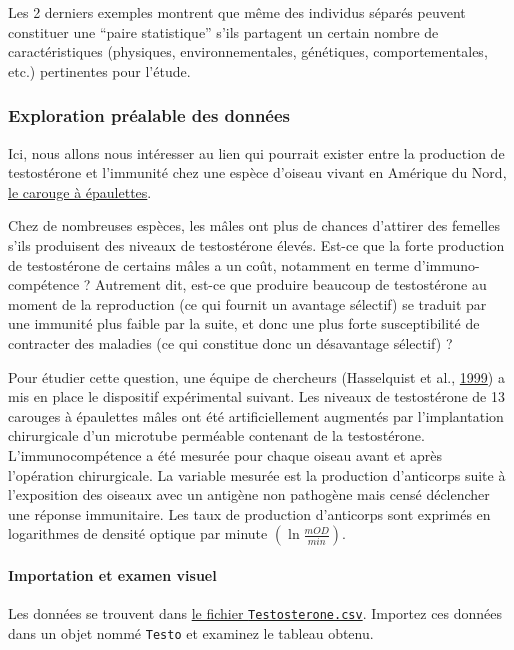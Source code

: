 \documentclass[
  a4paper,
]{article}
\begin{document}
Les 2 derniers exemples montrent que même des individus séparés peuvent constituer une ``paire statistique'' s'ils partagent un certain nombre de caractéristiques (physiques, environnementales, génétiques, comportementales, etc.) pertinentes pour l'étude.

\hypertarget{Explo2}{%
\subsubsection{Exploration préalable des données}\label{Explo2}}

Ici, nous allons nous intéresser au lien qui pourrait exister entre la production de testostérone et l'immunité chez une espèce d'oiseau vivant en Amérique du Nord, \href{https://fr.wikipedia.org/wiki/Carouge_à_épaulettes}{le carouge à épaulettes}.

Chez de nombreuses espèces, les mâles ont plus de chances d'attirer des femelles s'ils produisent des niveaux de testostérone élevés. Est-ce que la forte production de testostérone de certains mâles a un coût, notamment en terme d'immuno-compétence ? Autrement dit, est-ce que produire beaucoup de testostérone au moment de la reproduction (ce qui fournit un avantage sélectif) se traduit par une immunité plus faible par la suite, et donc une plus forte susceptibilité de contracter des maladies (ce qui constitue donc un désavantage sélectif) ?

Pour étudier cette question, une équipe de chercheurs (Hasselquist et al., \protect\hyperlink{ref-Hasselquist1999}{1999}) a mis en place le dispositif expérimental suivant. Les niveaux de testostérone de 13 carouges à épaulettes mâles ont été artificiellement augmentés par l'implantation chirurgicale d'un microtube perméable contenant de la testostérone. L'immunocompétence a été mesurée pour chaque oiseau avant et après l'opération chirurgicale. La variable mesurée est la production d'anticorps suite à l'exposition des oiseaux avec un antigène non pathogène mais censé déclencher une réponse immunitaire. Les taux de production d'anticorps sont exprimés en logarithmes de densité optique par minute \(\left(\ln\frac{mOD}{min}\right)\).

\hypertarget{importation-et-examen-visuel-1}{%
\paragraph{Importation et examen visuel}\label{importation-et-examen-visuel-1}}

Les données se trouvent dans \href{https://besibo.github.io/Biometrie3/data/Testosterone.csv}{le fichier \texttt{Testosterone.csv}}. Importez ces données dans un objet nommé \texttt{Testo} et examinez le tableau obtenu.
\end{document}
